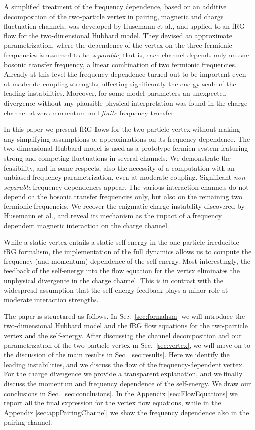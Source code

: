 A simplified treatment of the frequency dependence, based on an additive decomposition of the two-particle vertex in pairing, magnetic and charge fluctuation channels, was developed by Husemann et al., \cite{Husemann2012} and applied to an fRG flow for the two-dimensional Hubbard model. They devised an approximate parametrization, where the dependence of the vertex on the three fermionic frequencies is assumed to be {\em separable}, that is, each channel depends only on one bosonic transfer frequency, a linear combination of two fermionic frequencies. Already at this level the frequency dependence turned out to be important even at moderate coupling strengths, affecting significantly the energy scale of the leading instabilities. Moreover, for some model parameters an unexpected divergence without any plausible physical interpretation was found in the charge channel at zero momentum and {\em finite} frequency transfer. \cite{Husemann2012}

In this paper we present fRG flows for the two-particle vertex without making any simplifying assumptions or approximations on its frequency dependence. The two-dimensional Hubbard model is used as a prototype fermion system featuring strong and competing fluctuations in several channels. We demonstrate the feasibility, and in some respects, also the necessity of a computation with an unbiased frequency parametrization, even at moderate coupling. Significant {\em non-separable} frequency dependences appear. The various interaction channels do not depend on the bosonic transfer frequencies only, but also on the remaining two fermionic frequencies. We recover the enigmatic charge instability discovered by Husemann et al., \cite{Husemann2012} and reveal its mechanism as the impact of a frequency dependent magnetic interaction on the charge channel.

While a static vertex entails a static self-energy in the one-particle irreducible fRG formalism, the implementation of the full dynamics allows us to compute the frequency (and momentum) dependence of the self-energy. Most interestingly, the feedback of the self-energy into the flow equation for the vertex eliminates the unphysical divergence in the charge channel. This is in contrast with the widespread assumption that the self-energy feedback plays a minor role at moderate interaction strengths.

The paper is structured as follows. In Sec.~\ref{sec:formalism} we will introduce the two-dimensional Hubbard model and the fRG flow equations for the two-particle vertex and the self-energy.
After discussing the channel decomposition and our parametrization of the two-particle vertex  in Sec.~\ref{sec:vertex}, we will move on to the discussion of the main results in Sec.~\ref{sec:results}. Here we identify the leading instabilities, and we discuss the flow of the frequency-dependent vertex. For the charge divergence we provide a transparent explanation, and we finally discuss the momentum and frequency dependence of the self-energy. We draw our conclusions in Sec.~\ref{sec:conclusions}. In the Appendix \ref{sec:FlowEquations} we report all the final expression for the vertex flow equations, while in the Appendix \ref{sec:appPairingChannel} we show the frequency dependence also in the pairing channel.
